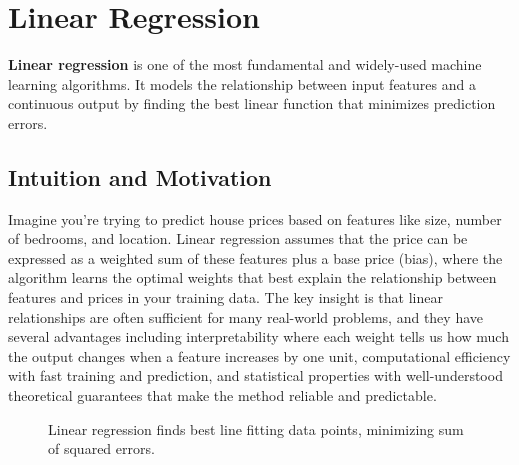 
\section{Linear Regression }
\label{sec:linear-regression}

\textbf{Linear regression} is one of the most fundamental and widely-used machine learning algorithms. It models the relationship between input features and a continuous output by finding the best linear function that minimizes prediction errors.

\subsection{Intuition and Motivation}

Imagine you're trying to predict house prices based on features like size, number of bedrooms, and location. Linear regression assumes that the price can be expressed as a weighted sum of these features plus a base price (bias), where the algorithm learns the optimal weights that best explain the relationship between features and prices in your training data. The key insight is that linear relationships are often sufficient for many real-world problems, and they have several advantages including interpretability where each weight tells us how much the output changes when a feature increases by one unit, computational efficiency with fast training and prediction, and statistical properties with well-understood theoretical guarantees that make the method reliable and predictable.

\begin{figure}[htbp]
\centering
{}
\caption{Linear regression finds best line fitting data points, minimizing sum of squared errors.}
\label{fig:linear-regression-example}
\end{figure}

